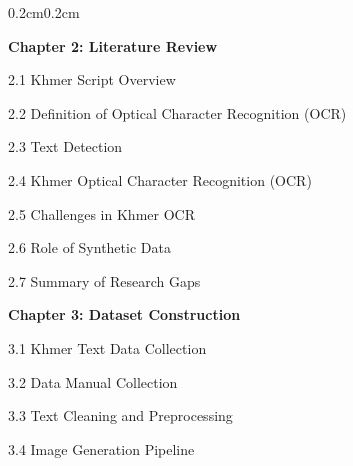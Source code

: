{\begin{adjustwidth}{0.2cm}{0.2cm}
    \vspace{0.5cm}
    { \textbf{Chapter 2: Literature Review}\dotfill\pageref{ch:literature}\par}
    { \hspace{0.5cm} 2.1 Khmer Script Overview\dotfill\pageref{sec:Khmer-overview}\par}
    { \hspace{0.5cm} 2.2 Definition of Optical Character Recognition (OCR)\dotfill\pageref{sec:ocr-definition}\par}
    { \hspace{0.5cm} 2.3 Text Detection\dotfill\pageref{sec:text_detection_literature}\par}
    { \hspace{0.5cm} 2.4 Khmer Optical Character Recognition (OCR)\dotfill\pageref{sec:khmer_OCR_literature}\par}
    { \hspace{0.5cm} 2.5 Challenges in Khmer OCR\dotfill\pageref{sec:datasets}\par}
    { \hspace{0.5cm} 2.6 Role of Synthetic Data\dotfill\pageref{sec:dl-models}\par}
    { \hspace{0.5cm} 2.7 Summary of Research Gaps\dotfill\pageref{sec:research-gaps}\par}

    \vspace{0.5cm}
    { \textbf{Chapter 3: Dataset Construction}\dotfill\pageref{ch:dataset}\par}
    { \hspace{0.5cm} 3.1 Khmer Text Data Collection\dotfill\pageref{sec:text-source}\par}
    { \hspace{0.5cm} 3.2 Data Manual Collection\dotfill\pageref{sec:manualcollection}\par}
    { \hspace{0.5cm} 3.3 Text Cleaning and Preprocessing\dotfill\pageref{sec:preprocessing}\par}
    { \hspace{0.5cm} 3.4 Image Generation Pipeline\dotfill\pageref{sec:generation}\par}


\end{adjustwidth}}

